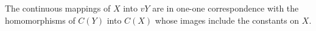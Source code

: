The continuous mappings of $X$ into $vY$ are in one-one correspondence with the homomorphisms of $C(Y)$ into $C(X)$ whose images include the constants on $X$.
